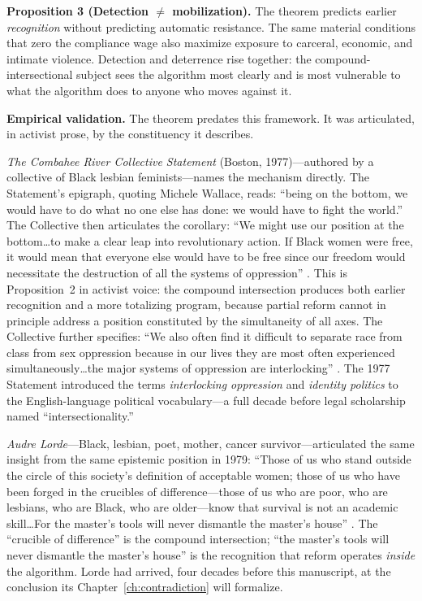 \begin{definition}
\medskip
\textbf{Proposition 3 (Detection $\neq$ mobilization).}
The theorem predicts earlier \textit{recognition} without predicting automatic resistance. The same material conditions that zero the compliance wage also maximize exposure to carceral, economic, and intimate violence. Detection and deterrence rise together: the compound-intersectional subject sees the algorithm most clearly and is most vulnerable to what the algorithm does to anyone who moves against it.
\end{definition}

\noindent\textbf{Empirical validation.} The theorem predates this framework. It was articulated, in activist prose, by the constituency it describes.

\textit{The Combahee River Collective Statement} (Boston, 1977)---authored by a collective of Black lesbian feminists---names the mechanism directly. The Statement's epigraph, quoting Michele Wallace, reads: ``being on the bottom, we would have to do what no one else has done: we would have to fight the world.'' The Collective then articulates the corollary: ``We might use our position at the bottom\ldots to make a clear leap into revolutionary action. If Black women were free, it would mean that everyone else would have to be free since our freedom would necessitate the destruction of all the systems of oppression'' \cite{combahee1977}. This is Proposition~2 in activist voice: the compound intersection produces both earlier recognition and a more totalizing program, because partial reform cannot in principle address a position constituted by the simultaneity of all axes. The Collective further specifies: ``We also often find it difficult to separate race from class from sex oppression because in our lives they are most often experienced simultaneously\ldots the major systems of oppression are interlocking'' \cite{combahee1977}. The 1977 Statement introduced the terms \textit{interlocking oppression} and \textit{identity politics} to the English-language political vocabulary---a full decade before legal scholarship named ``intersectionality.''

\textit{Audre Lorde}---Black, lesbian, poet, mother, cancer survivor---articulated the same insight from the same epistemic position in 1979: ``Those of us who stand outside the circle of this society's definition of acceptable women; those of us who have been forged in the crucibles of difference---those of us who are poor, who are lesbians, who are Black, who are older---know that survival is not an academic skill\ldots For the master's tools will never dismantle the master's house'' \cite{lorde_sister_outsider}. The ``crucible of difference'' is the compound intersection; ``the master's tools will never dismantle the master's house'' is the recognition that reform operates \textit{inside} the algorithm. Lorde had arrived, four decades before this manuscript, at the conclusion its Chapter~\ref{ch:contradiction} will formalize.

